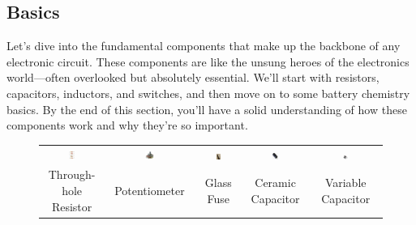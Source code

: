 \subsection{Basics}
\label{subsec:basics-passive}

Let's dive into the fundamental components that make up the backbone of any electronic circuit. These components are like the unsung heroes of the electronics world—often overlooked but absolutely essential. We'll start with resistors, capacitors, inductors, and switches, and then move on to some battery chemistry basics. By the end of this section, you'll have a solid understanding of how these components work and why they're so important.



\begin{figure}[h!]
    \centering
    \footnotesize
    \begin{tabular}{ccccc}
        \includegraphics[width=0.11\textwidth]{tech/images/resistor} &
        \includegraphics[width=0.11\textwidth]{tech/images/potentiometer} &
        \includegraphics[width=0.11\textwidth]{tech/images/fuse} &
        \includegraphics[width=0.11\textwidth]{tech/images/capacitor} &
        \includegraphics[width=0.11\textwidth]{tech/images/variable-capacitor} \\
        Through-hole Resistor & Potentiometer & Glass Fuse & Ceramic Capacitor & Variable Capacitor \\[2em]

\end{tabular}
\end{figure}
